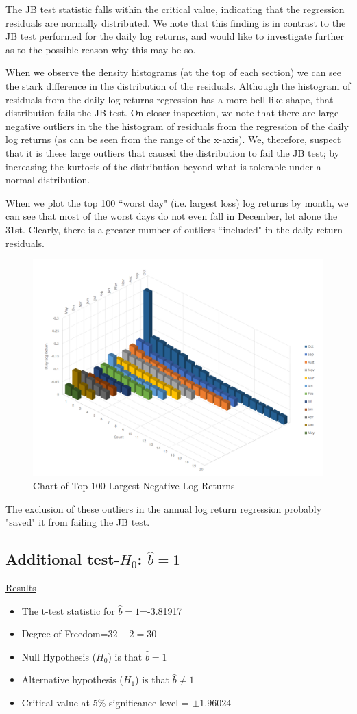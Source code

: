 \documentclass[a4paper]{article}
\begin{document}
	The JB test statistic falls within the critical value, indicating that the regression residuals are normally distributed. We note that this finding is in contrast to the JB test performed for the daily log returns, and would like to investigate further as to the possible reason why this may be so.
	
	When we observe the density histograms (at the top of each section) we can see the stark difference in the distribution of the residuals. Although the histogram of residuals from the daily log returns regression has a more bell-like shape, that distribution fails the JB test. On closer inspection, we note that there are large negative outliers in the the histogram of residuals from the regression of the daily log returns (as can be seen from the range of the x-axis). We, therefore, suspect that it is these large outliers that caused the distribution to fail the JB test; by increasing the kurtosis of the distribution beyond what is tolerable under a normal distribution.
	
	When we plot the top 100 ``worst day" (i.e. largest loss) log returns by month, we can see that most of the worst days do not even fall in December, let alone the 31st. Clearly, there is a greater number of outliers ``included" in the daily return residuals. 
	
	\begin{figure}[ht]
		\centering
		\includegraphics[width=0.6\linewidth, frame]{worstdays.png}
		\captionsetup{font=small}
		\caption{Chart of Top 100 Largest Negative Log Returns}
	\end{figure}
	
	The exclusion of these outliers in the annual log return regression probably "saved" it from failing the JB test. 
	
	\subsection{Additional test-$H_0$: $\hat{b}=1$}
	\underline{Results}
	\begin{itemize}[nosep]
		\item The t-test statistic for $\hat{b}=1$=-3.81917
		\item Degree of Freedom=$32 - 2 = 30$
		\item Null Hypothesis ($H_0$) is that $\hat{b}=1$
		\item Alternative hypothesis ($H_1$) is that $\hat{b} \ne 1$
		\item Critical value at 5\% significance level = $\pm 1.96024$
	\end{itemize}
	
\end{document}
